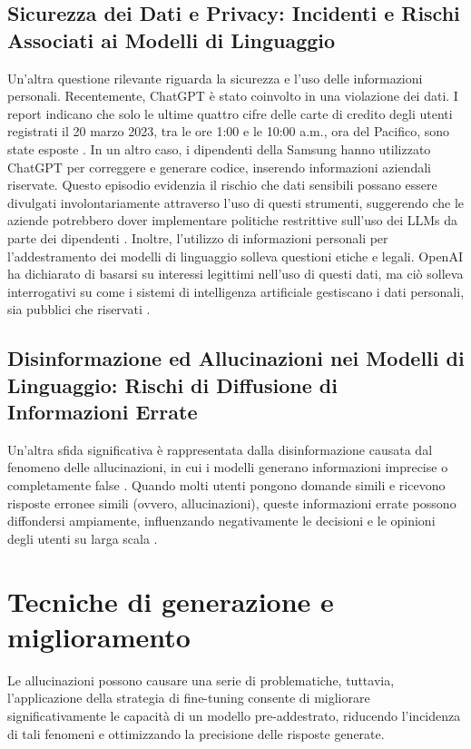\subsection{Sicurezza dei Dati e Privacy: Incidenti e Rischi Associati ai Modelli di Linguaggio}
Un'altra questione rilevante riguarda la sicurezza e l'uso delle informazioni personali. Recentemente, ChatGPT è stato coinvolto in una violazione dei dati. I report indicano che solo le ultime quattro cifre delle carte di credito degli utenti registrati il 20 marzo 2023, tra le ore 1:00 e le 10:00 a.m., ora del Pacifico, sono state esposte \cite{poremba2023chatgpt}. In un altro caso, i dipendenti della Samsung hanno utilizzato ChatGPT per correggere e generare codice, inserendo informazioni aziendali riservate. Questo episodio evidenzia il rischio che dati sensibili possano essere divulgati involontariamente attraverso l'uso di questi strumenti, suggerendo che le aziende potrebbero dover implementare politiche restrittive sull'uso dei LLMs da parte dei dipendenti \cite{maddison2023samsung}. Inoltre, l'utilizzo di informazioni personali per l'addestramento dei modelli di linguaggio solleva questioni etiche e legali. OpenAI ha dichiarato di basarsi su interessi legittimi nell'uso di questi dati, ma ciò solleva interrogativi su come i sistemi di intelligenza artificiale gestiscano i dati personali, sia pubblici che riservati \cite{burgess2023chatgpt}.

\subsection{Disinformazione ed Allucinazioni nei Modelli di Linguaggio: Rischi di Diffusione di Informazioni Errate}
Un'altra sfida significativa è rappresentata dalla disinformazione causata dal fenomeno delle allucinazioni, in cui i modelli generano informazioni imprecise o completamente false \cite{achiam2023gpt}. Quando molti utenti pongono domande simili e ricevono risposte erronee simili (ovvero, allucinazioni), queste informazioni errate possono diffondersi ampiamente, influenzando negativamente le decisioni e le opinioni degli utenti su larga scala \cite{10198233}.

\section{Tecniche di generazione e miglioramento}
Le allucinazioni possono causare una serie di problematiche, tuttavia, l'applicazione della strategia di fine-tuning consente di migliorare significativamente le capacità di un modello pre-addestrato, riducendo l'incidenza di tali fenomeni e ottimizzando la precisione delle risposte generate.
